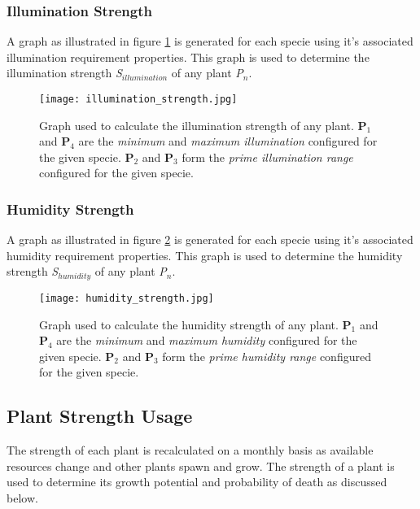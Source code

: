 \subsubsection{Illumination Strength}

A graph as illustrated in figure \ref{fig:illumination_strength} is generated for each specie using it's associated illumination requirement properties. This graph is used to determine the illumination strength \textit{S$_{illumination}$} of any plant \textit{P$_{n}$}.

\begin{figure}
\center
	\texttt{[image: illumination\_strength.jpg]}
	\caption{ Graph used to calculate the illumination strength of any plant. \textbf{P$_{1}$} and \textbf{P$_{4}$} are the \textit{minimum} and \textit{maximum illumination} configured for the given specie. \textbf{P$_{2}$} and \textbf{P$_{3}$} form the \textit{prime illumination range} configured for the given specie.  }	
	\label{fig:illumination_strength}
\end{figure}
	
\subsubsection{Humidity Strength}

A graph as illustrated in figure \ref{fig:humidity_strength} is generated for each specie using it's associated humidity requirement properties. This graph is used to determine the humidity strength \textit{S$_{humidity}$} of any plant \textit{P$_{n}$}.

\begin{figure}
\center
	\texttt{[image: humidity\_strength.jpg]}
	\caption{ Graph used to calculate the humidity strength of any plant. \textbf{P$_{1}$} and \textbf{P$_{4}$} are the \textit{minimum} and \textit{maximum humidity} configured for the given specie. \textbf{P$_{2}$} and \textbf{P$_{3}$} form the \textit{prime humidity range} configured for the given specie.  }	
	\label{fig:humidity_strength}
\end{figure}

\subsection{Plant Strength Usage}

The strength of each plant is recalculated on a monthly basis as available resources change and other plants spawn and grow. The strength of a plant is used to determine its growth potential and probability of death as discussed below.

